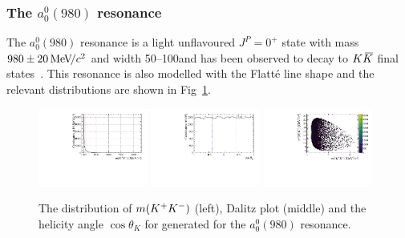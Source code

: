 \subsubsection{The $a_{0}^{0}(980)$ resonance}
The $a_{0}^{0}(980)$ resonance is a light unflavoured $J^{P} = 0^{+}$ state with mass $980\pm20{\mathrm{\,Me\kern -0.1em V\!/}c^2}$ and width 50--100\mevcc and has been observed to decay to $K{{\kern 0.2em\overline{\kern -0.2em K}{}}}$ final states~\cite{PDG2016}. This resonance is also modelled with the Flatt\'{e} line shape and the relevant distributions are shown in Fig~\ref{fig:DsKK_model_a0980}.
\begin{figure}[!h]
   \centering   
   \includegraphics[width=0.32\textwidth]{figs/B2DsPhi/a0_phi_mass.pdf}
   \includegraphics[width=0.32\textwidth]{figs/B2DsPhi/a0_Helicity.pdf}
   \includegraphics[width=0.32\textwidth]{figs/B2DsPhi/a0_Dalitz_plot.pdf}
   \caption{The distribution of $m({{K}^+}{{K}^-})$ (left), Dalitz plot (middle) and the helicity angle $\cos\theta_{K}$ for generated for the $a_{0}^{0}(980)$ resonance.} 
   \label{fig:DsKK_model_a0980}   
\end{figure}

